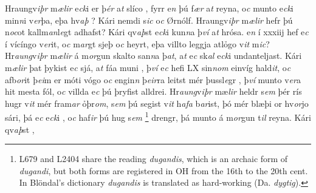 Hraungv\textit{iþr} m\textit{ælir} e\textit{ck}i er þ\textit{ér} a\textit{t} slíco  , fyrr e\textit{n} þú f\textit{ær} a\textit{t} reyna, 
o\textit{c} munto e\textit{ck}i min\textit{n}i v\textit{er}þa, eþa hv\textit{aþ} ?  
Kári nemdi s\textit{ic} o\textit{c} Ørnólf.
Hraungv\textit{iþr} m\textit{ælir} hefr þú n\textit{oc}ot  kallm\textit{an}l\textit{e}gt adhafst? 
Kári qv\textit{aþ}st e\textit{ck}i kun\textit{n}a þ\textit{ví} a\textit{t} hrósa. e\textit{n} í xxxiij   hef e\textit{c} í vícíngo v\textit{er}it, o\textit{c} m\textit{ar}gt sjeþ o\textit{c} heyrt,  eþa villto leggja    atlỏgo   v\textit{it} m\textit{ic}?
Hr\textit{aung}v\textit{iþr} m\textit{ælir} á m\textit{or}gun skalto san\textit{n}a þ\textit{at}, a\textit{t} e\textit{c} sk\textit{al}
e\textit{ck}i  undanteljast. 
Kári m\textit{ælir} þat  þykist e\textit{c} sjá, a\textit{t} fáa muni  , þ\textit{ví} e\textit{c} hefi  LX sin\textit{n}\textit{om}  einvíg  hald\textit{it}, o\textit{c}
afb\textit{or}it þ\textit{ei}m er móti vógo o\textit{c} engin\textit{n} þ\textit{eir}ra leitst mér   þussl\textit{e}gr  , 
þ\textit{ví} munto v\textit{er}a hit  mesta fól, o\textit{c}
villda e\textit{c}  þú  þryfist  alldrei. 
Hr\textit{aung}v\textit{iþr} mæ\textit{lir}  heldr s\textit{em} þér rís hugr v\textit{it} mér fram\textit{ar} ỏþr\textit{om}, s\textit{em} þú segist  v\textit{it} h\textit{afa} b\textit{ar}ist, 
  þó mér blæþi or hv\textit{or}jo sári,  þá   e\textit{c} e\textit{ck}i  , o\textit{c} haf\textit{ir} þú hug s\textit{em} \footnote{L679 and L2404 share the reading \textit{dugandis}, which is an archaic form of \textit{dugandi}, but both forms are registered in OH from the 16th to the 20th cent. In Blöndal's dictionary \textit{dugandis} is translated as hard-working (Da. \textit{dygtig}).} drengr, þá munto á m\textit{or}gun t\textit{il} reyna. 
Kári qv\textit{aþ}st  , 

